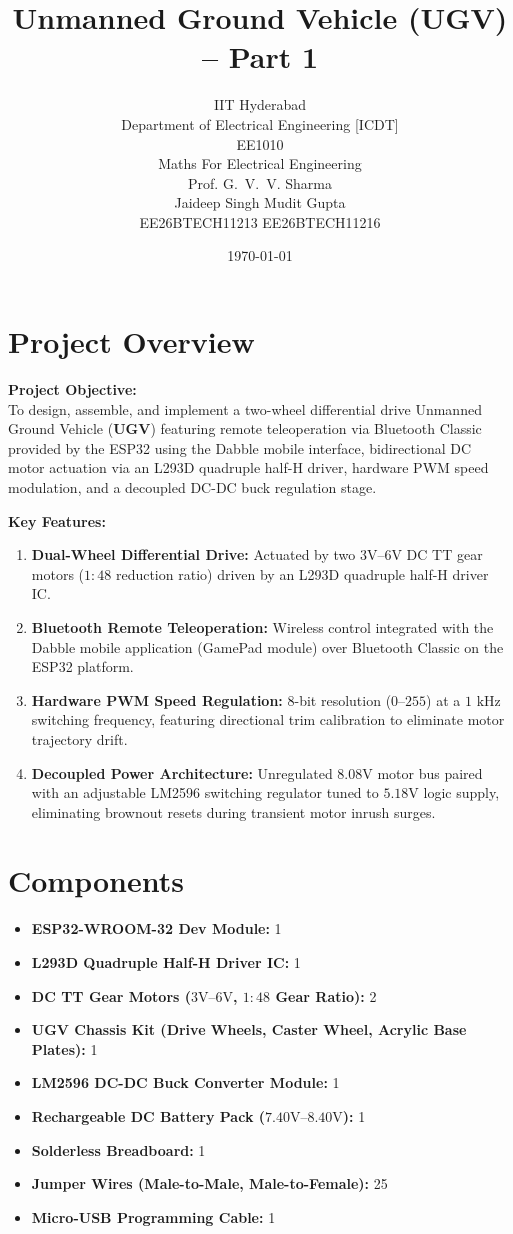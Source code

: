 \documentclass[journal,12pt,onecolumn]{IEEEtran}
\title{Unmanned Ground Vehicle (UGV) -- Part 1} \vspace{0.3cm}
\author{IIT Hyderabad \\ \vspace{0.1cm}
	Department of Electrical Engineering [ICDT] \\ 
	\vspace{0.55cm}EE1010     \\ Maths For Electrical Engineering \\ \vspace{0.15cm} Prof. G.~V.~V. Sharma \\\vspace{0.8cm}
	Jaideep Singh \hspace{4.3cm} Mudit Gupta \\ EE26BTECH11213 \hspace{2.8cm} EE26BTECH11216 \\\vspace{0.2cm} }
\date{\today}
\begin{document}
	
	\maketitle
	\section{Project Overview}
	\noindent \textbf{Project Objective:} \\
	To design, assemble, and implement a two-wheel differential drive Unmanned Ground Vehicle (\textbf{UGV}) featuring remote teleoperation via Bluetooth Classic provided by the ESP32 using the Dabble mobile interface, bidirectional DC motor actuation via an L293D quadruple half-H driver, hardware PWM speed modulation, and a decoupled DC-DC buck regulation stage.
	
	\noindent \textbf{Key Features:}
	\begin{enumerate}
		\item \textbf{Dual-Wheel Differential Drive:} Actuated by two $3\text{V--}6\text{V}$ DC TT gear motors ($1:48$ reduction ratio) driven by an L293D quadruple half-H driver IC.
		\item \textbf{Bluetooth Remote Teleoperation:} Wireless control integrated with the Dabble mobile application (GamePad module) over Bluetooth Classic on the ESP32 platform.
		\item \textbf{Hardware PWM Speed Regulation:} 8-bit resolution ($0\text{--}255$) at a $1\text{ kHz}$ switching frequency, featuring directional trim calibration to eliminate motor trajectory drift.
		\item \textbf{Decoupled Power Architecture:} Unregulated $8.08\text{V}$ motor bus paired with an adjustable LM2596 switching regulator tuned to $5.18\text{V}$ logic supply, eliminating brownout resets during transient motor inrush surges.
	\end{enumerate}

	\section{Components}
	\begin{itemize}
		\item \textbf{ESP32-WROOM-32 Dev Module:} 1
		\item \textbf{L293D Quadruple Half-H Driver IC:} 1
		\item \textbf{DC TT Gear Motors ($3\text{V--}6\text{V}$, $1:48$ Gear Ratio):} 2
		\item \textbf{UGV Chassis Kit (Drive Wheels, Caster Wheel, Acrylic Base Plates):} 1
		\item \textbf{LM2596 DC-DC Buck Converter Module:} 1
		\item \textbf{Rechargeable DC Battery Pack ($7.40\text{V--}8.40\text{V}$):} 1
		\item \textbf{Solderless Breadboard:} 1
		\item \textbf{Jumper Wires (Male-to-Male, Male-to-Female):} 25
		\item \textbf{Micro-USB Programming Cable:} 1
	\end{itemize}
	\newpage
\end{document}
